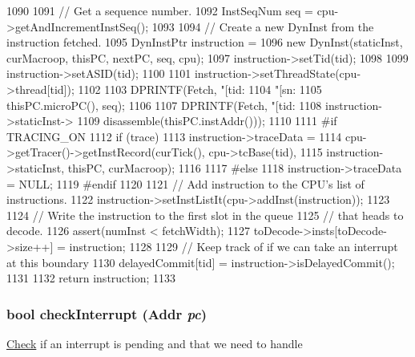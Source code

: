 \begin{DoxyCode}
1090 {
1091     // Get a sequence number.
1092     InstSeqNum seq = cpu->getAndIncrementInstSeq();
1093 
1094     // Create a new DynInst from the instruction fetched.
1095     DynInstPtr instruction =
1096         new DynInst(staticInst, curMacroop, thisPC, nextPC, seq, cpu);
1097     instruction->setTid(tid);
1098 
1099     instruction->setASID(tid);
1100 
1101     instruction->setThreadState(cpu->thread[tid]);
1102 
1103     DPRINTF(Fetch, "[tid:%
1104             "[sn:%
1105             thisPC.microPC(), seq);
1106 
1107     DPRINTF(Fetch, "[tid:%
1108             instruction->staticInst->
1109             disassemble(thisPC.instAddr()));
1110 
1111 #if TRACING_ON
1112     if (trace) {
1113         instruction->traceData =
1114             cpu->getTracer()->getInstRecord(curTick(), cpu->tcBase(tid),
1115                     instruction->staticInst, thisPC, curMacroop);
1116     }
1117 #else
1118     instruction->traceData = NULL;
1119 #endif
1120 
1121     // Add instruction to the CPU's list of instructions.
1122     instruction->setInstListIt(cpu->addInst(instruction));
1123 
1124     // Write the instruction to the first slot in the queue
1125     // that heads to decode.
1126     assert(numInst < fetchWidth);
1127     toDecode->insts[toDecode->size++] = instruction;
1128 
1129     // Keep track of if we can take an interrupt at this boundary
1130     delayedCommit[tid] = instruction->isDelayedCommit();
1131 
1132     return instruction;
1133 }
\end{DoxyCode}
\hypertarget{classDefaultFetch_a0949b3c8e74ae282010e2a8698525c72}{
\subsubsection[{checkInterrupt}]{\setlength{\rightskip}{0pt plus 5cm}bool checkInterrupt ({\bf Addr} {\em pc})}}
\label{classDefaultFetch_a0949b3c8e74ae282010e2a8698525c72}
\hyperlink{classCheck}{Check} if an interrupt is pending and that we need to handle 


